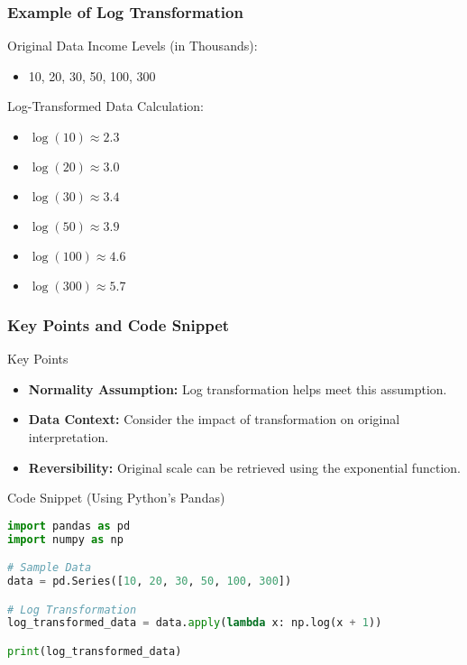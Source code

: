 \documentclass[aspectratio=169]{beamer}
\begin{document}
\begin{frame}[fragile]
  \frametitle{Example of Log Transformation}
  \begin{block}{Original Data}
    Income Levels (in Thousands):
    \begin{itemize}
      \item 10, 20, 30, 50, 100, 300
    \end{itemize}
  \end{block}

  \begin{block}{Log-Transformed Data}
    Calculation:
    \begin{itemize}
      \item \( \log(10) \approx 2.3 \)
      \item \( \log(20) \approx 3.0 \)
      \item \( \log(30) \approx 3.4 \)
      \item \( \log(50) \approx 3.9 \)
      \item \( \log(100) \approx 4.6 \)
      \item \( \log(300) \approx 5.7 \)
    \end{itemize}
  \end{block}
\end{frame}

\begin{frame}[fragile]
  \frametitle{Key Points and Code Snippet}
  \begin{block}{Key Points}
    \begin{itemize}
      \item \textbf{Normality Assumption:} Log transformation helps meet this assumption.
      \item \textbf{Data Context:} Consider the impact of transformation on original interpretation.
      \item \textbf{Reversibility:} Original scale can be retrieved using the exponential function.
    \end{itemize}
  \end{block}

  \begin{block}{Code Snippet (Using Python's Pandas)}
    \begin{lstlisting}[language=Python]
import pandas as pd
import numpy as np

# Sample Data
data = pd.Series([10, 20, 30, 50, 100, 300])

# Log Transformation
log_transformed_data = data.apply(lambda x: np.log(x + 1))

print(log_transformed_data)
    \end{lstlisting}
  \end{block}
\end{frame}
\end{document}
